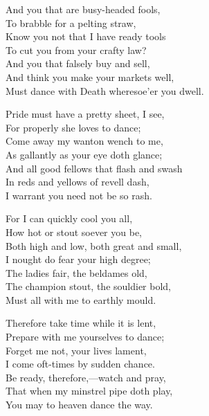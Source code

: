 \begin{dcverse}
\begin{patverse}
And you that are busy-headed fools,\\
To brabble for a pelting straw,\\
Know you not that I have ready tools\\
To cut you from your crafty law?\\
And you that falsely buy and sell,\\
And think you make your markets well,\\
Must dance with Death wheresoe’er you dwell.
\end{patverse}

\begin{patverse}
Pride must have a pretty sheet, I see,\\
For properly she loves to dance;\\
Come away my wanton wench to me,\\
As gallantly as your eye doth glance;\\
And all good fellows that flash and swash\\
In reds and yellows of revell dash,\\
I warrant you need not be so rash.
\end{patverse}

\begin{patverse}
For I can quickly cool you all,\\
How hot or stout soever you be,\\
Both high and low, both great and small,\\
I nought do fear your high degree;\\
The ladies fair, the beldames old,\\
The champion stout, the souldier bold,\\
Must all with me to earthly mould.
\end{patverse}

\begin{patverse}
Therefore take time while it is lent,\\
Prepare with me yourselves to dance;\\
Forget me not, your lives lament,\\
I come oft-times by sudden chance.\\
Be ready, therefore,—watch and pray,\\
That when my minstrel pipe doth play,\\
You may to heaven dance the way.
\end{patverse}
\end{dcverse}

